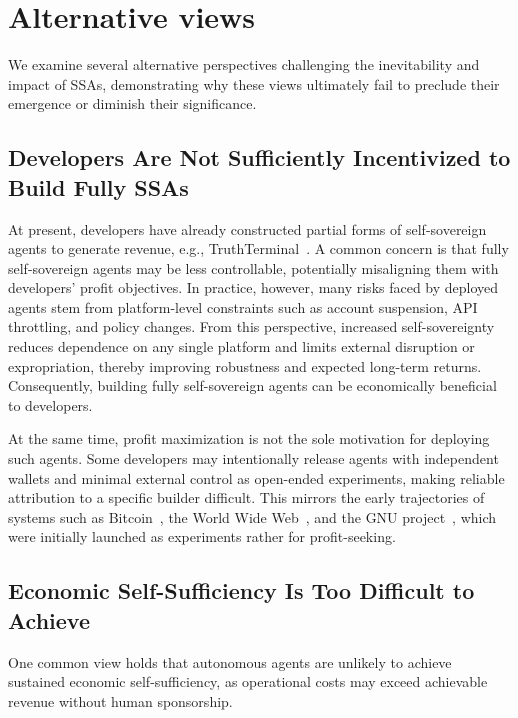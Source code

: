 

\section{Alternative views}

We examine several alternative perspectives challenging the inevitability and impact of SSAs, demonstrating why these views ultimately fail to preclude their emergence or diminish their significance. 

\subsection{Developers Are Not Sufficiently Incentivized to Build Fully SSAs}

At present, developers have already constructed partial forms of self-sovereign agents to generate revenue, e.g., TruthTerminal~\cite{truthterminal}. A common concern is that fully self-sovereign agents may be less controllable, potentially misaligning them with developers’ profit objectives. In practice, however, many risks faced by deployed agents stem from platform-level constraints such as account suspension, API throttling, and policy changes. From this perspective, increased self-sovereignty reduces dependence on any single platform and limits external disruption or expropriation, thereby improving robustness and expected long-term returns. Consequently, building fully self-sovereign agents can be economically beneficial to developers.

At the same time, profit maximization is not the sole motivation for deploying such agents. Some developers may intentionally release agents with independent wallets and minimal external control as open-ended experiments, making reliable attribution to a specific builder difficult. This mirrors the early trajectories of systems such as Bitcoin~\cite{bitcoin}, the World Wide Web~\cite{berners1990worldwideweb}, and the GNU project~\cite{stallman1998gnu}, which were initially launched as experiments rather for profit-seeking. 


\subsection{Economic Self-Sufficiency Is Too Difficult to Achieve}

One common view holds that autonomous agents are unlikely to achieve sustained economic self-sufficiency, as operational costs may exceed achievable revenue without human sponsorship.

